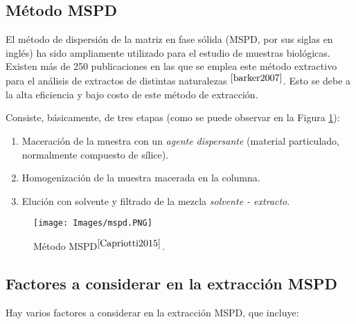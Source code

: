 \begin{center}
	\section{M\'etodo MSPD}
\end{center}

\noindent
\justify

El m\'etodo de dispersi\'on de la matriz en fase s\'olida (MSPD, por sus siglas en ingl\'es) ha sido ampliamente utilizado para el estudio de muestras biol\'ogicas. Existen m\'as de 250 publicaciones en las que se emplea este m\'etodo extractivo para el an\'alisis de extractos de distintas naturalezas $^{\cite{barker2007}}$. Esto se debe a la alta eficiencia y bajo costo de este m\'etodo de extracci\'on. 

\noindent
\justify

Consiste, b\'asicamente, de tres etapas (como se puede observar en la Figura \ref{mspd}):

\begin{enumerate}
	\item Maceraci\'on de la muestra con un \textit{agente dispersante} (material particulado, normalmente compuesto de s\'ilice).
	\item Homogenizaci\'on de la muestra macerada en la columna.
	\item Eluci\'on con solvente y filtrado de la mezcla \textit{solvente - extracto}.
\end{enumerate}

\begin{figure}[h!]
\centering
\texttt{[image: Images/mspd.PNG]}
\caption{M\'etodo MSPD$^{\cite{Capriotti2015}}$.}
\label{mspd}
\end{figure}

\subsection{Factores a considerar en la extracci\'on MSPD}

\noindent
\justify

Hay varios factores a considerar en la extracci\'on MSPD, que incluye:

